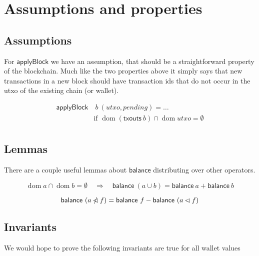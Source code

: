\documentclass{article}
\DeclareMathOperator{\dom}{dom}
\newcommand{\restrictdom}{\lhd}
\newcommand{\subtractdom}{\mathbin{\slashed{\restrictdom}}}
\begin{document}
\section{Assumptions and properties}

\subsection{Assumptions}

For $\mathsf{applyBlock}$ we have an assumption, that should be a
straightforward property of the blockchain. Much like the two properties above
it simply says that new transactions in a new block should have transaction
ids that do not occur in the utxo of the existing chain (or wallet).

\begin{equation} \label{applyBlock_assumption}
\begin{split}
\mathsf{applyBlock} & ~ b ~ (utxo, pending) = \ldots \\
& \text{if } \dom (\mathsf{txouts} ~ b) \cap \dom utxo = \emptyset \\
\end{split}
\end{equation}


\subsection{Lemmas}

There are a couple useful lemmas about $\mathsf{balance}$ distributing over
other operators.

\begin{equation} \label{lemma_balance_minus}
  \dom a \cap \dom b = \emptyset \quad \Longrightarrow \quad
  \mathsf{balance} ~ (a \cup b) = \mathsf{balance} ~ a + \mathsf{balance} ~ b
\end{equation}

\begin{equation} \label{lemma_balance_union}
  \mathsf{balance} ~ (a \subtractdom f) = \mathsf{balance} ~ f - \mathsf{balance} ~ (a \restrictdom f) \\
\end{equation}


\subsection{Invariants}
\label{sec:invariants}

We would hope to prove the following invariants are true for all wallet values
\end{document}
